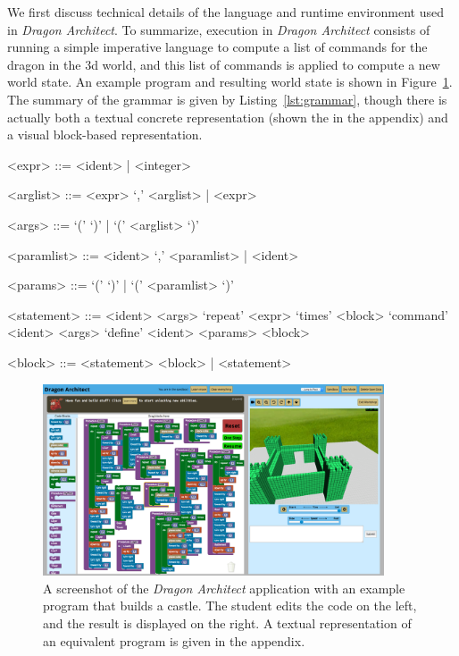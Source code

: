 \documentclass{sig-alternate}
\newcommand{\da}{\emph{Dragon Architect}}
\newenvironment{BNF}
  {\captionsetup{type=lstlisting}}
  {}
\begin{document}
We first discuss technical details of the language and runtime environment used in \da. To summarize, execution in \da{} consists of running a simple imperative language to compute a list of commands for the dragon in the 3d world, and this list of commands is applied to compute a new world state. An example program and resulting world state is shown in Figure~\ref{fig:full-program}. The summary of the grammar is given by Listing~\ref{lst:grammar}, though there is actually both a textual concrete representation (shown the in the appendix) and a visual block-based representation.

\begin{BNF}
\caption{\da{} grammar}
\label{lst:grammar}
\begin{grammar}
<expr> ::= <ident> | <integer>

<arglist> ::= <expr> `,' <arglist> | <expr>

<args> ::= `(' `)' | `(' <arglist> `)'

<paramlist> ::= <ident> `,' <paramlist> | <ident>

<params> ::= `(' `)' | `(' <paramlist> `)'

<statement> ::= <ident> <args>
\alt `repeat' <expr> `times' <block>
\alt `command' <ident> <args>
\alt `define' <ident> <params> <block>

<block> ::= <statement> <block> | <statement>
\end{grammar}
\end{BNF}

\begin{figure}[t!]
  \centering
  \includegraphics[width=0.9\textwidth]{images/full-castle}
  \caption{A screenshot of the \da{} application with an example program that builds a castle. The student edits the code on the left, and the result is displayed on the right. A textual representation of an equivalent program is given in the appendix.}
  \label{fig:full-program}
\end{figure}
\end{document}
